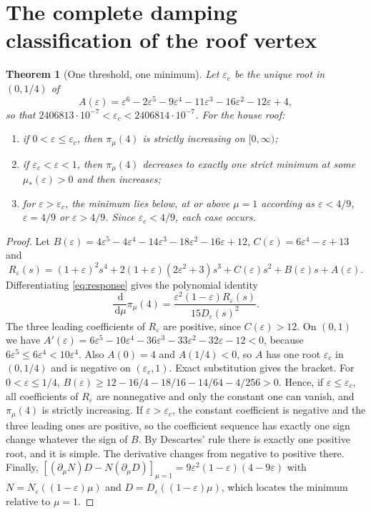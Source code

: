 \documentclass[11pt,a4paper]{article}
\newtheorem{theorem}{Theorem}[section]
\theoremstyle{definition}\newtheorem{conjecture}{Conjecture}
\theoremstyle{remark}\newtheorem{remark}[theorem]{Remark}
\newcommand{\eps}{\varepsilon}
\newcommand{\dd}{\,\mathrm{d}}
\begin{document}
\section{The complete damping classification of the roof vertex}\label{sec:classification}
\begin{theorem}[One threshold, one minimum]\label{thm:threshold}
Let $\eps_c$ be the unique root in $(0,1/4)$ of
\begin{equation}\label{eq:A}
 A(\eps)=\eps^6-2\eps^5-9\eps^4-11\eps^3-16\eps^2-12\eps+4,
\end{equation}
so that $2406813\cdot10^{-7}<\eps_c<2406814\cdot10^{-7}$. For the house roof:
\begin{enumerate}
 \item if $0<\eps\leq\eps_c$, then $\pi_\mu(4)$ is strictly increasing on $[0,\infty)$;
 \item if $\eps_c<\eps<1$, then $\pi_\mu(4)$ decreases to exactly one strict minimum at some $\mu_*(\eps)>0$ and then increases;
 \item for $\eps>\eps_c$, the minimum lies below, at or above $\mu=1$ according as $\eps<4/9$, $\eps=4/9$ or $\eps>4/9$. Since $\eps_c<4/9$, each case occurs.
\end{enumerate}
\end{theorem}

\begin{proof}
Let $B(\eps)=4\eps^5-4\eps^4-14\eps^3-18\eps^2-16\eps+12$, $C(\eps)=6\eps^4-\eps+13$ and
\[
 R_\eps(s)=(1+\eps)^2s^4+2(1+\eps)(2\eps^2+3)s^3+C(\eps)s^2+B(\eps)s+A(\eps).
\]
Differentiating \eqref{eq:response} gives the polynomial identity
\begin{equation}\label{eq:derivative}
 \frac{\dd}{\dd\mu}\pi_\mu(4)=\frac{\eps^2(1-\eps)R_\eps(s)}{15D_\eps(s)^2}.
\end{equation}
The three leading coefficients of $R_\eps$ are positive, since $C(\eps)>12$. On $(0,1)$ we have $A'(\eps)=6\eps^5-10\eps^4-36\eps^3-33\eps^2-32\eps-12<0$, because $6\eps^5\leq6\eps^4<10\eps^4$. Also $A(0)=4$ and $A(1/4)<0$, so $A$ has one root $\eps_c$ in $(0,1/4)$ and is negative on $(\eps_c,1)$. Exact substitution gives the bracket. For $0<\eps\leq1/4$,
$B(\eps)\geq12-16/4-18/16-14/64-4/256>0$. Hence, if $\eps\leq\eps_c$, all coefficients of $R_\eps$ are nonnegative and only the constant one can vanish, and $\pi_\mu(4)$ is strictly increasing. If $\eps>\eps_c$, the constant coefficient is negative and the three leading ones are positive, so the coefficient sequence has exactly one sign change whatever the sign of $B$. By Descartes' rule there is exactly one positive root, and it is simple. The derivative changes from negative to positive there. Finally, $[(\partial_\mu N)D-N(\partial_\mu D)]_{\mu=1}=9\eps^2(1-\eps)(4-9\eps)$ with $N=N_\eps((1-\eps)\mu)$ and $D=D_\eps((1-\eps)\mu)$, which locates the minimum relative to $\mu=1$.
\end{proof}
\end{document}
